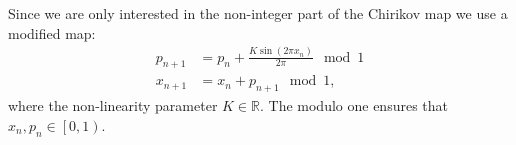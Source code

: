 
Since we are only interested in the non-integer part of the Chirikov map we use a modified map:
\begin{subequations}\label{eq:chirikov}
	\begin{align}
		\label{eq:chirikov:p} p_{n + 1} &= p_n + \frac{K \sin \left(  2 \pi x_n \right)}{2 \pi} \mod 1 \\
		\label{eq:chirikov:x} x_{n + 1} &= x_n + p_{n + 1} \mod 1,
	\end{align}
\end{subequations}	
where the non-linearity parameter $K \in \mathbb{R}$. The modulo one ensures that $x_n, p_n \in \left[ 0, 1 \right)$.